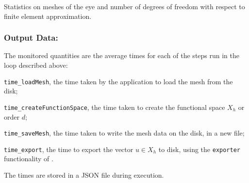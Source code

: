 \begin{table}[!ht]
    \centering

  \caption{Statistics on meshes of the eye and number of degrees of freedom with respect to finite element approximation.}
  \label{tab:spec:app-feelpp:eye2brain:mesh_stats}
\end{table}

\subsubsection{Output Data:}

The monitored quantities are the average times for each of the steps run in the loop described above:
\begin{inparaenum}[\it(i)]
\item \texttt{time\_loadMesh}, the time taken by the application to load the mesh from the disk;
\item \texttt{time\_createFunctionSpace}, the time taken to create the functional space $X_h$ or order $d$;
\item \texttt{time\_saveMesh}, the time taken to write the mesh data on the disk, in a new file;
\item \texttt{time\_export}, the time to export the vector $u\in X_h$ to disk, using the \texttt{exporter} functionality of \Feelpp.
\end{inparaenum}
The times are stored in a JSON file during execution.


